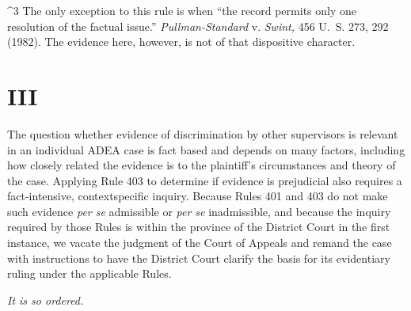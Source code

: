 ^3 The only exception to this rule is when ``the record permits only
one resolution of the factual issue.'' \emph{Pullman-Standard} v.
\emph{Swint,} 456 U.~S. 273, 292 (1982). The evidence here, however, is
not of that dispositive character.

\section{III}

  The question whether evidence of discrimination by other supervisors
is relevant in an individual ADEA case is fact based and depends on
many factors, including how closely related the evidence is to the
plaintiff's circumstances and theory of the case. Applying Rule 403
to determine if evidence is prejudicial also requires a fact-intensive,
contextspecific inquiry. Because Rules 401 and 403 do not make such
evidence \emph{per se} admissible or \emph{per se} inadmissible, and because
the inquiry required by those Rules is within the province of the
District Court in the first instance, we vacate the judgment of the
Court of Appeals and remand the case with instructions to have the
District Court clarify the basis for its evidentiary ruling under the
applicable Rules.

\begin{flushright}\emph{It is so ordered.}\end{flushright}
